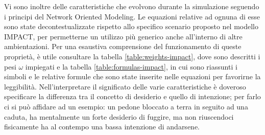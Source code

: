 Vi sono inoltre delle caratteristiche che evolvono durante la simulazione seguendo i principi del Network Oriented Modeling. Le equazioni relative ad ognuna di esse sono state decontestualizzate rispetto allo specifico scenario proposto nel modello IMPACT, per permetterne un utilizzo più generico anche all'interno di altre ambientazioni. \newline 
Per una esaustiva comprensione del funzionamento di queste proprietà, è utile consultare la tabella \ref{table:weights-impact}, dove sono descritti i pesi $\omega$ impiegati e la tabella \ref{table:formulas-impact}, in cui sono riassunti i simboli e le relative formule che sono state inserite nelle equazioni per favorirne la leggibilità. \newline
Nell'interpretare il significato delle varie caratteristiche è doveroso specificare la differenza tra il concetto di desiderio e quello di intenzione; per farlo ci si può affidare ad un esempio: un pedone bloccato a terra in seguito ad una caduta, ha mentalmente un forte desiderio di fuggire, ma non riuscendoci fisicamente ha al contempo una bassa intenzione di andarsene.

